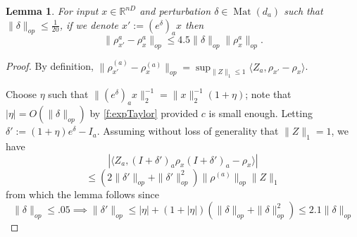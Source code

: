 \documentclass[aos]{imsart}
\newtheorem{lemma}[theorem]{Lemma}
\theoremstyle{definition}
\numberwithin{equation}{section}
\DeclareMathOperator{\Mat}{Mat}
\newcommand{\R}{{\mathbb{R}}}
\newcommand{\samp}{x}
\begin{document}
\begin{appendix}

\begin{lemma} \label{atoaaRobustness}
For input $\samp \in \R^{nD}$ and perturbation $\delta \in \Mat(d_{a})$ such that $\|\delta\|_{op} \leq \frac{1}{20}$, if we denote $\samp' := (e^{\delta})_{a} \samp$ then
\[ \|\rho_{\samp'}^{a} - \rho_{\samp}^{a}\|_{op} \leq 4.5 \|\delta\|_{op} \|\rho_{\samp}^{a}\|_{op}   . \]
\end{lemma}
\begin{proof} By definition, $\|\rho_{\samp'}^{(a)} - \rho_{\samp}^{(a)}\|_{op} = \sup_{\|Z\|_{1} \leq 1} \langle Z_{a}, \rho_{\samp'} - \rho_{\samp} \rangle $.


Choose $\eta$ such that  $\|(e^{\delta})_{a} \samp\|_{2}^{-1} = \|\samp\|_{2}^{-1} (1 + \eta)$; note that $|\eta| = O(\|\delta\|_{op})$ by \cref{f:expTaylor} provided $c$ is small enough. Letting $\delta' := (1+\eta)e^{\delta} - I_{a}$. Assuming without loss of generality that $\|Z\|_{1} = 1$, we have
\[ | \langle Z_{a}, (I+\delta')_a \rho_{\samp} (I+\delta')_a - \rho_{\samp} \rangle | \]
\[ \leq (2\|\delta'\|_{op} + \|\delta'\|_{op}^{2}) \|\rho^{(a)}\|_{op} \|Z\|_{1}    \]
from which the lemma follows since
\[ \|\delta\|_{op} \leq .05 \implies \|\delta'\|_{op} \leq |\eta| + (1+|\eta|)(\|\delta\|_{op} + \|\delta\|_{op}^{2}) \leq  2.1 \|\delta\|_{op} \]
\end{proof}


\end{appendix}
\end{document}
